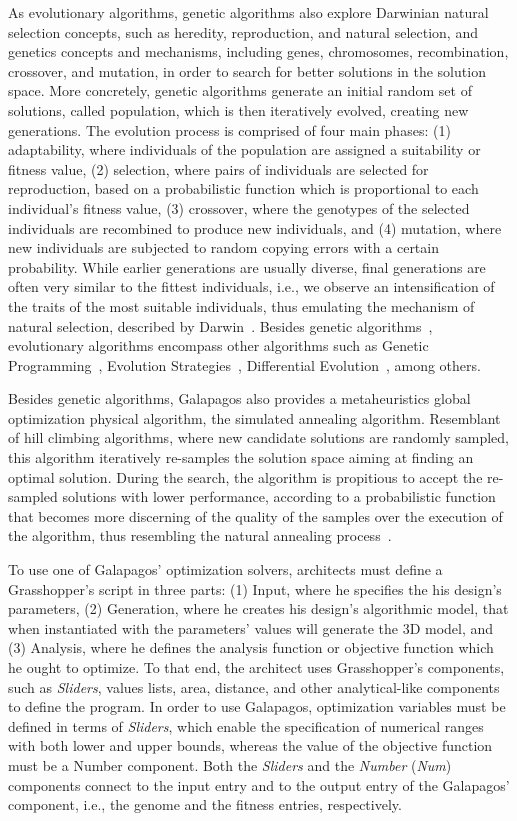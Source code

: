 	As evolutionary algorithms, genetic algorithms also explore Darwinian natural selection concepts, such as heredity, reproduction, and natural selection, and genetics concepts and mechanisms, including genes, chromosomes, recombination, crossover, and mutation, in order to search for better solutions in the solution space. More concretely, genetic algorithms generate an initial random set of solutions, called population, which is then iteratively evolved, creating new generations. The evolution process is comprised of four main phases: (1) adaptability, where individuals of the population are assigned a suitability or fitness value, (2) selection, where pairs of individuals are selected for reproduction, based on a probabilistic function which is proportional to each individual's fitness value, (3) crossover, where the genotypes of the selected individuals are recombined to produce new individuals, and (4) mutation, where new individuals are subjected to random copying errors with a certain probability. While earlier generations are usually diverse, final generations are often very similar to the fittest individuals, i.e., we observe an intensification of the traits of the most suitable individuals, thus emulating the mechanism of natural selection, described by Darwin~\cite{Brownlee2011}. Besides genetic algorithms~\cite{Golberg1989,Holland1992}, evolutionary algorithms encompass other algorithms such as Genetic Programming~\cite{Koza1992}, Evolution Strategies~\cite{Schwefel1981}, Differential Evolution~\cite{Storn1997}, among others. 
	
	Besides genetic algorithms, Galapagos also provides a metaheuristics global optimization physical algorithm, the simulated annealing algorithm. Resemblant of hill climbing algorithms, where new candidate solutions are randomly sampled, this algorithm iteratively re-samples the solution space aiming at finding an optimal solution. During the search, the algorithm is propitious to accept the re-sampled solutions with lower performance, according to a probabilistic function that becomes more discerning of the quality of the samples over the execution of the algorithm, thus resembling the natural annealing process~\cite{Brownlee2011}. 

	To use one of Galapagos' optimization solvers, architects must define a Grasshopper's script in three parts: (1) Input, where he specifies the his design's parameters, (2) Generation, where he creates his design's algorithmic model, that when instantiated with the parameters' values will generate the 3D model, and (3) Analysis, where he defines the analysis function or objective function which he ought to optimize. To that end, the architect uses Grasshopper's components, such as \textit{Sliders}, values lists, area, distance, and other analytical-like components to define the program. In order to use Galapagos, optimization variables must be defined in terms of \textit{Sliders}, which enable the specification of numerical ranges with both lower and upper bounds, whereas the value of the objective function must be a Number component. Both the \textit{Sliders} and the \textit{Number} (\textit{Num}) components connect to the input entry and to the output entry of the Galapagos' component, i.e., the genome and the fitness entries, respectively. 

